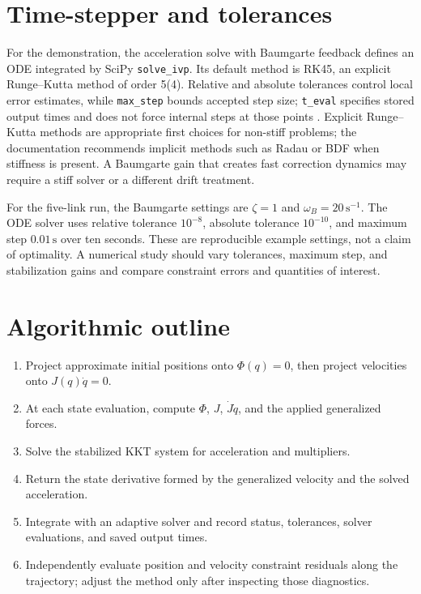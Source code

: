 \documentclass[../main.tex]{subfiles}
\begin{document}
\section{Time-stepper and tolerances}
For the demonstration, the acceleration solve with Baumgarte feedback defines an ODE integrated by SciPy \texttt{solve\_ivp}. Its default method is RK45, an explicit Runge--Kutta method of order 5(4). Relative and absolute tolerances control local error estimates, while \texttt{max\_step} bounds accepted step size; \texttt{t\_eval} specifies stored output times and does not force internal steps at those points \cite{scipy_solve_ivp}. Explicit Runge--Kutta methods are appropriate first choices for non-stiff problems; the documentation recommends implicit methods such as Radau or BDF when stiffness is present. A Baumgarte gain that creates fast correction dynamics may require a stiff solver or a different drift treatment.

For the five-link run, the Baumgarte settings are \(\zeta=1\) and \(\omega_B=20\,\mathrm{s}^{-1}\). The ODE solver uses relative tolerance \(10^{-8}\), absolute tolerance \(10^{-10}\), and maximum step \(0.01\,\mathrm{s}\) over ten seconds. These are reproducible example settings, not a claim of optimality. A numerical study should vary tolerances, maximum step, and stabilization gains and compare constraint errors and quantities of interest.

\section{Algorithmic outline}
\begin{enumerate}
 \item Project approximate initial positions onto \(\Phi(q)=0\), then project velocities onto \(J(q)\dot q=0\).
 \item At each state evaluation, compute \(\Phi\), \(J\), \(\dot J\dot q\), and the applied generalized forces.
 \item Solve the stabilized KKT system for acceleration and multipliers.
 \item Return the state derivative formed by the generalized velocity and the solved acceleration.
 \item Integrate with an adaptive solver and record status, tolerances, solver evaluations, and saved output times.
 \item Independently evaluate position and velocity constraint residuals along the trajectory; adjust the method only after inspecting those diagnostics.
\end{enumerate}
\end{document}
